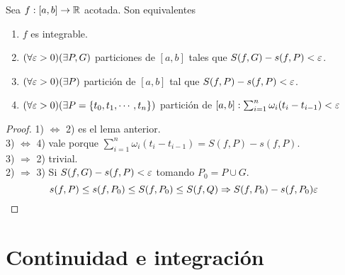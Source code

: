 \begin{theorem}
  Sea $f: [a, b] \to \mathbb{R}$ acotada. Son equivalentes \begin{enumerate}
    \item $f$ es integrable.
    \item $(\forall \varepsilon > 0)(\exists P, G)$ particiones de $[a, b]$ tales que $S(f, G) - s(f, P) < \varepsilon$.
    \item $(\forall \varepsilon > 0)(\exists P)$ partición de $[a, b]$ tal que $S(f, P) - s(f, P) < \varepsilon$.
    \item $(\forall \varepsilon > 0)(\exists P = \{ t_0, t_1, \cdots, t_n \})$ partición de $[a, b] : \sum_{i = 1}^n \omega_i (t_i - t_{i-1}) < \varepsilon$
  \end{enumerate}

  \begin{proof}
    1) $\iff$ 2) es el lema anterior. \\
    3) $\iff$ 4) vale porque $\sum_{i = 1}^n \omega_i (t_i - t_{i-1}) = S(f, P) - s(f, P)$. \\
    3) $\Rightarrow$ 2) trivial. \\
    2) $\Rightarrow$ 3) Si $S(f, G) - s(f, P) < \varepsilon$ tomando $P_0 = P \cup G$. \begin{equation}
      s(f, P) \leq s(f, P_0) \leq S(f, P_0) \leq S(f, Q) \Rightarrow S(f, P_0) - s(f, P_0) \varepsilon
    \end{equation}
  \end{proof}
\end{theorem}

\section{Continuidad e integración}

